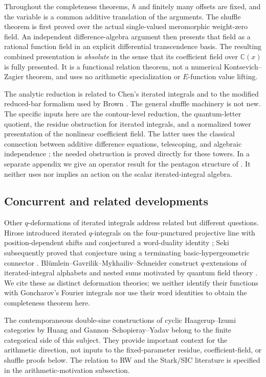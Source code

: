 \documentclass[11pt]{article}
\numberwithin{equation}{section}
\theoremstyle{definition}
\theoremstyle{remark}
\newcommand{\C}{\mathbb C}
\newcommand{\qh}{\hbar}
\begin{document}
Throughout the completeness theorems, $\qh$ and finitely many offsets are
fixed, and the variable is a common additive translation of the arguments.
The shuffle theorem is first proved over the actual single-valued meromorphic
weight-zero field. An independent difference-algebra argument then presents
that field as a rational function field in an explicit differential
transcendence basis. The resulting combined presentation is \emph{absolute}
in the sense that its coefficient field over $\C(x)$ is fully presented.
It is a functional relation theorem, not a numerical Kontsevich--Zagier
theorem, and uses no arithmetic specialization or $E$-function value lifting.

The analytic reduction is related to Chen's iterated integrals
\cite{Chen1977} and to the modified reduced-bar formalism used by Brown
\cite[Section~3]{Brown2009}. The general shuffle machinery is not new.
The specific inputs here are the contour-level reduction, the quantum-letter
quotient, the residue obstruction for iterated integrals, and a normalized
tower presentation of the nonlinear coefficient field. The latter uses the
classical connection between additive difference equations, telescoping,
and algebraic independence \cite{Schneider2010,HardouinSinger2008}; the
needed obstruction is proved directly for these towers.
In a separate appendix we give an operator result for the pentagon structure
of \cite{Goncharov2007}. It neither uses nor implies an action on the scalar
iterated-integral algebra.

\subsection{Concurrent and related developments}

Other $q$-deformations of iterated integrals address related but different
questions. Hirose introduced iterated $q$-integrals on the four-punctured
projective line with position-dependent shifts and conjectured a word-duality
identity \cite{Hirose2026}; Seki subsequently proved that conjecture using a
terminating basic-hypergeometric connector \cite{Seki2026}.
Bl\"umlein--Gavrilik--Mykhailiv--Schneider construct $q$-extensions of
iterated-integral alphabets and nested sums motivated by quantum field
theory \cite{BGMS2026}. We cite these as distinct deformation theories;
we neither identify their functions with Goncharov's Fourier integrals
nor use their word identities to obtain the completeness theorem here.

The contemporaneous double-sine constructions of cyclic Haagerup--Izumi
categories by Huang \cite{Huang2026} and Gannon--Schopieray--Yadav
\cite{GSY2026} belong to the finite categorical side of this subject.
They provide important context for the arithmetic direction, not inputs
to the fixed-parameter residue, coefficient-field, or shuffle proofs below.
The relation to RW and the Stark/SIC literature is specified in the
arithmetic-motivation subsection.
\end{document}

